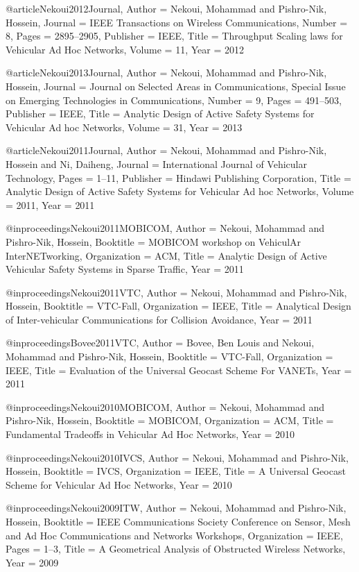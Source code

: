 {{@article{Nekoui2012Journal,
	Author = {Nekoui, Mohammad and Pishro-Nik, Hossein},
	Journal = {IEEE Transactions on Wireless Communications},
	Number = {8},
	Pages = {2895--2905},
	Publisher = {IEEE},
	Title = {Throughput Scaling laws for Vehicular Ad Hoc Networks},
	Volume = {11},
	Year = {2012}}

@article{Nekoui2013Journal,
	Author = {Nekoui, Mohammad and Pishro-Nik, Hossein},
	Journal = {Journal on Selected Areas in Communications, Special Issue on Emerging Technologies in Communications},
	Number = {9},
	Pages = {491--503},
	Publisher = {IEEE},
	Title = {Analytic Design of Active Safety Systems for Vehicular Ad hoc Networks},
	Volume = {31},
	Year = {2013}}

@article{Nekoui2011Journal,
	Author = {Nekoui, Mohammad and Pishro-Nik, Hossein and Ni, Daiheng},
	Journal = {International Journal of Vehicular Technology},
	Pages = {1--11},
	Publisher = {Hindawi Publishing Corporation},
	Title = {Analytic Design of Active Safety Systems for Vehicular Ad hoc Networks},
	Volume = {2011},
	Year = {2011}}

@inproceedings{Nekoui2011MOBICOM,
	Author = {Nekoui, Mohammad and Pishro-Nik, Hossein},
	Booktitle = {MOBICOM workshop on VehiculAr InterNETworking},
	Organization = {ACM},
	Title = {Analytic Design of Active Vehicular Safety Systems in Sparse Traffic},
	Year = {2011}}

@inproceedings{Nekoui2011VTC,
	Author = {Nekoui, Mohammad and Pishro-Nik, Hossein},
	Booktitle = {VTC-Fall},
	Organization = {IEEE},
	Title = {Analytical Design of Inter-vehicular Communications for Collision Avoidance},
	Year = {2011}}

@inproceedings{Bovee2011VTC,
	Author = {Bovee, Ben Louis and Nekoui, Mohammad and Pishro-Nik, Hossein},
	Booktitle = {VTC-Fall},
	Organization = {IEEE},
	Title = {Evaluation of the Universal Geocast Scheme For VANETs},
	Year = {2011}}

@inproceedings{Nekoui2010MOBICOM,
	Author = {Nekoui, Mohammad and Pishro-Nik, Hossein},
	Booktitle = {MOBICOM},
	Organization = {ACM},
	Title = {Fundamental Tradeoffs in Vehicular Ad Hoc Networks},
	Year = {2010}}

@inproceedings{Nekoui2010IVCS,
	Author = {Nekoui, Mohammad and Pishro-Nik, Hossein},
	Booktitle = {IVCS},
	Organization = {IEEE},
	Title = {A Universal Geocast Scheme for Vehicular Ad Hoc Networks},
	Year = {2010}}

@inproceedings{Nekoui2009ITW,
	Author = {Nekoui, Mohammad and Pishro-Nik, Hossein},
	Booktitle = {IEEE Communications Society Conference on Sensor, Mesh and Ad Hoc Communications and Networks Workshops},
	Organization = {IEEE},
	Pages = {1--3},
	Title = {A Geometrical Analysis of Obstructed Wireless Networks},
	Year = {2009}}

}}
